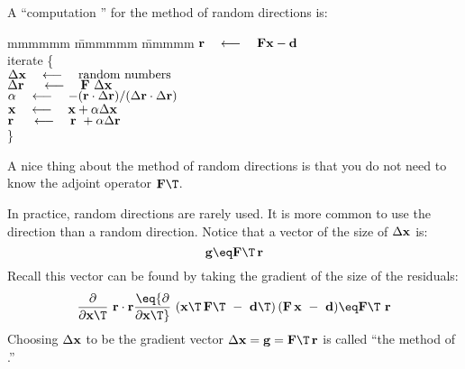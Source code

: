 \par
A ``computation '' for the method of random directions is:
\def\padarrow{\quad\longleftarrow\quad}
\label{lsq/'randtemplate'}
\begin{tabbing}
mmmmmm \= mmmmmm \= mmmmm \kill
\> $\bold r \padarrow \bold F \bold x - \bold d$ \\
\> {\rm iterate \{ }                                                    \\
\>      \>  $\Delta \bold x   \padarrow {\rm random\ numbers}$          \\
\>      \>  $\Delta \bold r\  \padarrow \bold F \  \Delta \bold x$      \\
\>      \> $\alpha \padarrow
                -(       \bold r \cdot \Delta\bold r )/
                 (\Delta \bold r \cdot \Delta\bold r )
                $
                \\
\>      \> $\bold x   \padarrow \bold x   + \alpha\Delta \bold x$       \\
\>      \> $\bold r\  \padarrow \bold r\  + \alpha\Delta \bold r$       \\
\>      \> \}                                                   
\end{tabbing}
A nice thing about the method of random directions is that you
do not need to know the adjoint operator $\bold F\T$.

\par
In practice, random directions are rarely used.
It is more common to use the  direction than a random direction.
Notice that a vector of the size of $\Delta \bold x$ is:
\begin{equation}
\bold g \eq  \bold F\T\,\bold r
\end{equation}
Recall this vector can be found by taking the gradient
of the size of the residuals:
\begin{equation}
{\partial \over  \partial \bold x\T }  \ \bold r \cdot \bold r
\eq
{\partial \over  \partial \bold x\T }  \ 
( \bold x\T \, \bold F\T  \ -\  \bold d\T) \,
( \bold F  \, \bold x   \ -\  \bold d)
\eq
\bold F\T \  \bold r
\end{equation}
Choosing $\Delta \bold x$ to be the gradient vector
$\Delta\bold x = \bold g = \bold F\T\,\bold r$
is called ``the method of .''

